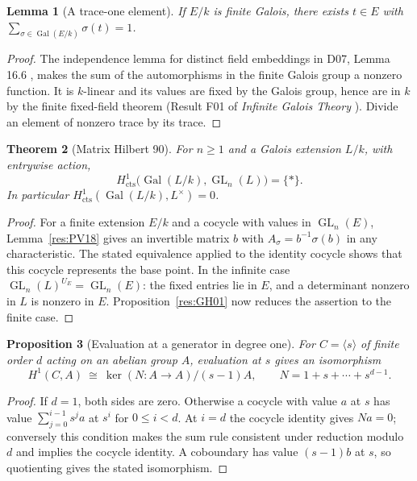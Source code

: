 \documentclass[11pt,oneside,openany]{book}
\newtheorem{theorem}{Theorem}[chapter]
\newtheorem{lemma}[theorem]{Lemma}
\newtheorem{proposition}[theorem]{Proposition}
\theoremstyle{definition}
\theoremstyle{remark}
\begin{document}
\begin{lemma}[A trace-one element]
\label{res:GH02}
If \(E/k\) is finite Galois, there exists \(t\in E\) with
\(\sum_{\sigma\in\operatorname{Gal}(E/k)}\sigma(t)=1\).
\end{lemma}
\begin{proof}
The independence lemma for distinct field embeddings in D07,
Lemma 16.6 \cite[PDF p.~125]{mg-d07}, makes the sum of the
automorphisms in the finite Galois group a nonzero function.
It is \(k\)-linear and its values are fixed by the Galois group, hence
are in \(k\) by the finite fixed-field theorem (Result F01 of
\emph{Infinite Galois Theory} \cite[PDF p.~4]{mg-aft}).
Divide an element of nonzero trace by its trace.
\end{proof}

\begin{theorem}[Matrix Hilbert 90]
\label{res:GH03}
For \(n\geq 1\) and a Galois extension \(L/k\), with entrywise action,
\[
 H^1_{\mathrm{cts}}\bigl(\operatorname{Gal}(L/k),
                         \operatorname{GL}_n(L)\bigr)=\{*\}.
\]
In particular \(H^1_{\mathrm{cts}}(\operatorname{Gal}(L/k),L^\times)=0\).
\end{theorem}
\begin{proof}
For a finite extension \(E/k\) and a cocycle with values in
\(\operatorname{GL}_n(E)\), Lemma~\ref{res:PV18} gives an invertible
matrix \(b\) with \(A_\sigma=b^{-1}\sigma(b)\) in any characteristic.
The stated equivalence applied to the identity cocycle shows
that this cocycle represents the base point.
In the infinite case \(\operatorname{GL}_n(L)^{U_E}=
\operatorname{GL}_n(E)\): the fixed entries lie in \(E\), and a
determinant nonzero in \(L\) is nonzero in \(E\).
Proposition~\ref{res:GH01} now reduces the assertion to the finite case.
\end{proof}

\begin{proposition}[Evaluation at a generator in degree one]
\label{res:GH04}
For \(C=\langle s\rangle\) of finite order \(d\) acting on an abelian
group \(A\), evaluation at \(s\) gives an isomorphism
\[
 H^1(C,A)\ \cong\ \ker(N:A\to A)/(s-1)A,\qquad
 N=1+s+\cdots+s^{d-1}.
\]
\end{proposition}
\begin{proof}
If \(d=1\), both sides are zero. Otherwise a cocycle with value \(a\)
at \(s\) has value \(\sum_{j=0}^{i-1}s^j a\) at \(s^i\) for
\(0\leq i<d\). At \(i=d\) the cocycle identity gives \(Na=0\);
conversely this condition makes the sum rule consistent under
reduction modulo \(d\) and implies the cocycle identity. A
coboundary has value \((s-1)b\) at \(s\), so quotienting gives
the stated isomorphism.
\end{proof}
\end{document}
